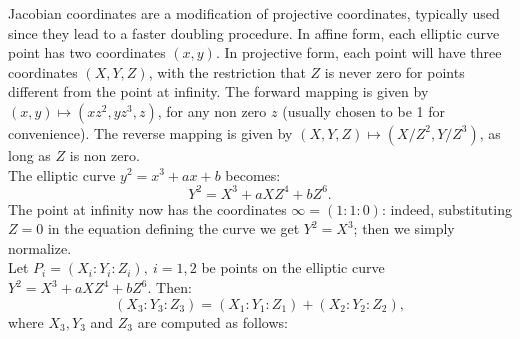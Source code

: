 \bigskip
\noindent
Jacobian coordinates are a modification of projective coordinates, typically used since they lead to a faster doubling procedure. In affine form, each elliptic curve point has two coordinates $(x, y)$. In projective form, each point will have three coordinates $(X, Y, Z)$, with the restriction that $Z$ is never zero for points different from the point at infinity. The forward mapping is given by $(x, y) \mapsto (xz^2, yz^3, z)$, for any non zero $z$ (usually chosen to be 1 for convenience). The reverse mapping is given by $(X, Y, Z) \mapsto (X/Z^2, Y/Z^3)$, as long as $Z$ is non zero.
\\
The elliptic curve $y^2 = x^3 + ax + b$ becomes:
$$Y^2 = X^3 + aXZ^4 + bZ^6.$$
The point at infinity now has the coordinates $\infty = (1 : 1 : 0)$: indeed, substituting $Z = 0$ in the equation defining the curve we get $Y^2 = X^3$; then we simply normalize.
\\
Let $P_i = (X_i : Y_i : Z_i), \ i = 1, 2$ be points on the elliptic curve $Y^2 = X^3 + aXZ^4 + bZ^6$. Then:
$$(X_3 : Y_3 : Z_3) = (X_1 : Y_1 : Z_1) + (X_2 : Y_2 : Z_2),$$
where $X_3,Y_3$ and $Z_3$ are computed as follows:
